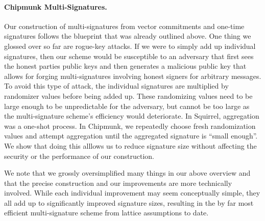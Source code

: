\paragraph{Chipmunk Multi-Signatures.}
Our construction of multi-signatures from vector commitments and one-time signatures follows the blueprint that was already outlined above.
One thing we glossed over so far are rogue-key attacks.
If we were to simply add up individual signatures, then our scheme would be susceptible to an adversary that first sees the honest parties public keys and then generates a malicious public key that allows for forging multi-signatures involving honest signers for arbitrary messages.
To avoid this type of attack, the individual signatures are multiplied by randomizer values before being added up.
These randomizing values need to be large enough to be unpredictable for the adversary, but cannot be too large as the multi-signature scheme's efficiency would deteriorate.
In Squirrel, aggregation was a one-shot process.
In Chipmunk, we repeatedly choose fresh randomization values and attempt aggregation until the aggregated signature is ``small enough''.
We show that doing this alllows us to reduce signature size without affecting the security or the performance of our construction.



We note that we grossly oversimplified many things in our above overview and that the precise construction and our improvements are more technically involved.
While each individual improvement may seem conceptually simple, they all add up to significantly improved signature sizes, resulting in the by far most efficient multi-signature scheme from lattice assumptions to date.




